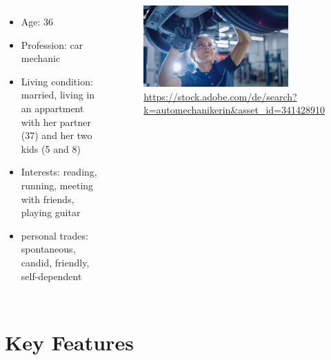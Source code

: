 \documentclass[aspectratio=169]{beamer}
\begin{document}
\begin{frame}
\begin{columns}
	\begin{itemize}
		\item Age: 36
		\item Profession: car mechanic
		\item Living condition: married, living in an appartment with her partner (37) and her two kids (5 and 8)
		\item Interests: reading, running, meeting with friends, playing guitar 
		\item personal trades: spontaneous, candid, friendly, self-dependent
	\end{itemize}
	 \begin{figure}
		 \centering
		\includegraphics[width=0.8\textwidth]{media/car_mechanic.jpg}
		\caption{\url{https://stock.adobe.com/de/search?k=automechanikerin\&asset_id=341428910}}
	\end{figure}
\end{columns}
\end{frame}






\section{Key Features}

\end{document}
